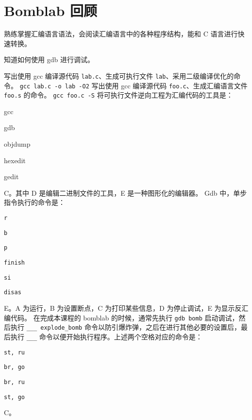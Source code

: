 \chapter{Bomblab 回顾}\thispagestyle{empty}
    \begin{summary}
        \begin{compactitem}
            \item 熟练掌握汇编语言语法，会阅读汇编语言中的各种程序结构，能和 C 语言进行快速转换。
            \item 知道如何使用 gdb 进行调试。
        \end{compactitem}
    \end{summary}

    \begin{problems}
        \pro 写出使用 gcc 编译源代码 \verb|lab.c|、生成可执行文件 \verb|lab|、采用二级编译优化的命令。
        \sol \verb|gcc lab.c -o lab -O2|
        \pro 写出使用 gcc 编译源代码 \verb|foo.c|、生成汇编语言文件 \verb|foo.s| 的命令。
        \sol \verb|gcc foo.c -S|
        \pro 将可执行文件逆向工程为汇编代码的工具是：
        \begin{choices}
            \item gcc
            \item gdb
            \item objdump
            \item hexedit
            \item gedit
        \end{choices}
        \sol C。其中 D 是编辑二进制文件的工具，E 是一种图形化的编辑器。
        \pro Gdb 中，单步指令执行的命令是：
        \begin{choices}
            \item \verb|r|
            \item \verb|b|
            \item \verb|p|
            \item \verb|finish|
            \item \verb|si|
            \item \verb|disas|
        \end{choices}
        \sol E。A 为运行，B 为设置断点，C 为打印某些信息，D 为停止调试，E 为显示反汇编代码。
         在完成本课程的 bomblab 的时候，通常先执行 \verb|gdb bomb| 启动调试，然后执行 \verb|___ explode_bomb| 命令以防引爆炸弹，之后在进行其他必要的设置后，最后执行 \verb|___| 命令以便开始执行程序。上述两个空格对应的命令是：
        \begin{choices}
            \item \verb|st, ru|
            \item \verb|br, go|
            \item \verb|br, ru|
            \item \verb|st, go|
        \end{choices}
        \sol C。
    \end{problems}